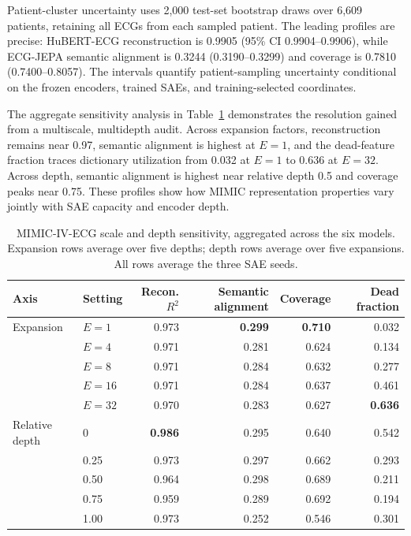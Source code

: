 Patient-cluster uncertainty uses 2,000 test-set bootstrap draws over 6,609 patients, retaining all ECGs from each sampled patient. The leading profiles are precise: HuBERT-ECG reconstruction is 0.9905 (95\% CI 0.9904--0.9906), while ECG-JEPA semantic alignment is 0.3244 (0.3190--0.3299) and coverage is 0.7810 (0.7400--0.8057). The intervals quantify patient-sampling uncertainty conditional on the frozen encoders, trained SAEs, and training-selected coordinates.

The aggregate sensitivity analysis in Table~\ref{tab:mimic-scale-depth} demonstrates the resolution gained from a multiscale, multidepth audit. Across expansion factors, reconstruction remains near 0.97, semantic alignment is highest at $E=1$, and the dead-feature fraction traces dictionary utilization from 0.032 at $E=1$ to 0.636 at $E=32$. Across depth, semantic alignment is highest near relative depth 0.5 and coverage peaks near 0.75. These profiles show how MIMIC representation properties vary jointly with SAE capacity and encoder depth.

\begin{table}[t]
  \centering
  \small
  \caption{MIMIC-IV-ECG scale and depth sensitivity, aggregated across the six models. Expansion rows average over five depths; depth rows average over five expansions. All rows average the three SAE seeds.}
  \label{tab:mimic-scale-depth}
  \begin{tabular}{llrrrr}
    \toprule
    Axis & Setting & Recon. $R^2$ & Semantic alignment & Coverage & Dead fraction \\
    \midrule
    Expansion & $E=1$  & 0.973 & \textbf{0.299} & \textbf{0.710} & 0.032 \\
              & $E=4$  & 0.971 & 0.281 & 0.624 & 0.134 \\
              & $E=8$  & 0.971 & 0.284 & 0.632 & 0.277 \\
              & $E=16$ & 0.971 & 0.284 & 0.637 & 0.461 \\
              & $E=32$ & 0.970 & 0.283 & 0.627 & \textbf{0.636} \\
    \midrule
    Relative depth & 0    & \textbf{0.986} & 0.295 & 0.640 & 0.542 \\
                   & 0.25 & 0.973 & 0.297 & 0.662 & 0.293 \\
                   & 0.50 & 0.964 & 0.298 & 0.689 & 0.211 \\
                   & 0.75 & 0.959 & 0.289 & 0.692 & 0.194 \\
                   & 1.00 & 0.973 & 0.252 & 0.546 & 0.301 \\
    \bottomrule
  \end{tabular}
\end{table}

